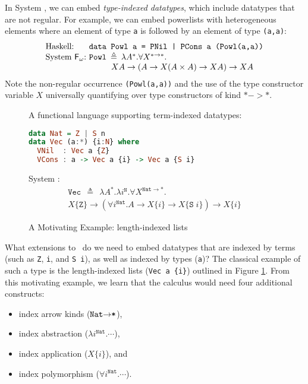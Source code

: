 In System \Fw, we can embed \emph{type-indexed datatypes}, which include
datatypes that are not regular. For example, we can embed powerlists with
heterogeneous elements where an element of type \texttt{a} is followed by
an element of type \texttt{(a,a)}:
\[
\begin{array}{ll}
\text{Haskell:} & \!\!\!\!\texttt{data Powl a = PNil | PCons a (Powl(a,a))} \\
\text{System \Fw:} & \!\!\!\!\texttt{{Powl}}\:\triangleq\:
\lambda A^{*}.\forall X^{*\to*}.\\ \qquad
& \qquad X A\to (A\to X(A\times A)\to X A)\to XA
\end{array}
\]
Note the non-regular occurrence \texttt{(Powl(a,a))} and
the use of the type constructor variable $X$ universally quantifying over
type constructors of kind $* -> *$.

\begin{figure}\noindent
{}
\!\!\!\!\!A functional language supporting term-indexed datatypes: \vspace*{-4.5pt}
\begin{lstlisting}[basicstyle={\ttfamily},language=Haskell]
data Nat = Z | S n
data Vec (a:*) {i:N} where
  VNil  : Vec a {Z}
  VCons : a -> Vec a {i} -> Vec a {S i}
\end{lstlisting}\noindent
\!\!\!System \Fi: \vspace*{-7pt}
\begin{multline*}\!\!\!\!\!\!\!
\texttt{{Vec}}\:\:\triangleq\:\:\lambda A^{*}.\lambda i^{\texttt{{N}}}.
\forall X^{\texttt{{Nat}}\to*}.\\
X\{\texttt{{Z}}\}\to
(\forall i^{\texttt{{Nat}}}.A\to X\{i\}\to X\{\texttt{{S}}\; i\})\to X\{i\}
\end{multline*}\vspace*{-10pt}
\caption{A Motivating Example: length-indexed lists}
\label{fig:motiv}
\end{figure}

What extensions to \Fw\ do we need to embed datatypes that are indexed by
terms (such as \texttt{Z}, \texttt{i}, and \texttt{S i}), as well as indexed by types (\texttt{a})?
The classical example of such a type is the length-indexed lists
(\verb|Vec a {i}|) outlined in Figure \ref{fig:motiv}.
From this motivating example, we learn that
the calculus would need four additional constructs:
\begin{itemize}
\item index arrow kinds ($\texttt{{Nat}\ensuremath{\to}*}$),
\item index abstraction ($\lambda i^{\texttt{{Nat}}}.\cdots$),
\item index application ($X\{i\}$), and
\item index polymorphism ($\forall i^{\texttt{{Nat}}}.\cdots$).
\end{itemize}


